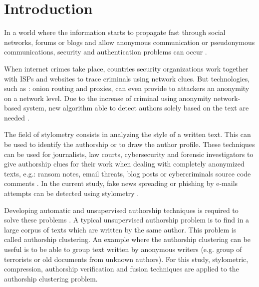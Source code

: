 
\chapter{Introduction \label{sec:introduction}}

In a world where the information starts to propagate fast through social networks, forums or blogs and allow anonymous communication or pseudonymous communications, security and authentication problems can occur \cite{automated_unsupervised} \cite{kocher_pan16}.

When internet crimes take place, countries security organizations work together with ISPs and websites to trace criminals using network clues.
But technologies, such as : onion routing and proxies, can even provide to attackers an anonymity on a network level.
Due to the increase of criminal using anonymity network-based system, new algorithm able to detect authors solely based on the text are needed \cite{automated_unsupervised} \cite{attribution_in_cyberspace}.

The field of stylometry consists in analyzing the style of a written text.
This can be used to identify the authorship or to draw the author profile.
These techniques can be used for journalists, law courts, cybersecurity and forensic investigators to give authorship clues for their work when dealing with completely anonymized texts, e.g.: ransom notes, email threats, blog posts or cybercriminals source code comments \cite{pan16_clustering_site}.
In the current study, fake news spreading or phishing by e-mails attempts can be detected using stylometry \cite{unine_pan20_fake_news}.

Developing automatic and unsupervised authorship techniques is required to solve these problems \cite{automated_unsupervised}.
A typical unsupervised authorship problem is to find in a large corpus of texts which are written by the same author.
This problem is called authorship clustering.
An example where the authorship clustering can be useful is to be able to group text written by anonymous writers (e.g. group of terrorists or old documents from unknown authors).
For this study, stylometric, compression, authorship verification and fusion techniques are applied to the authorship clustering problem.





